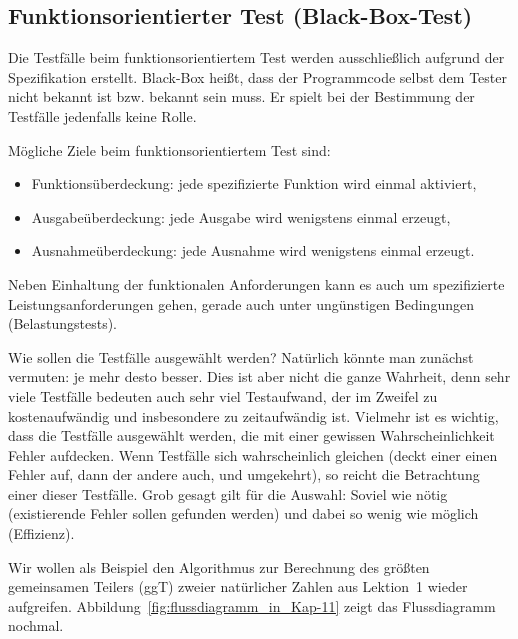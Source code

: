 \subsection{Funktionsorientierter Test (Black-Box-Test)}
\label{sec:Kap-11-1-4}

Die Testfälle beim funktionsorientiertem Test werden ausschließlich aufgrund der Spezifikation erstellt. 
Black-Box heißt, dass der Programmcode selbst dem Tester nicht bekannt ist bzw. bekannt sein muss. Er spielt bei der Bestimmung der Testfälle jedenfalls keine Rolle.

Mögliche Ziele beim funktionsorientiertem Test sind:
\begin{itemize}
	\item Funktionsüberdeckung: jede spezifizierte Funktion wird einmal aktiviert,
	\item Ausgabeüberdeckung: jede Ausgabe wird wenigstens einmal erzeugt, 
	\item Ausnahmeüberdeckung: jede Ausnahme wird wenigstens einmal erzeugt.
\end{itemize}

Neben Einhaltung der funktionalen Anforderungen kann es auch um spezifizierte Leistungsanforderungen gehen, gerade auch unter ungünstigen Bedingungen
\linebreak %
(Belastungs\-tests).

Wie sollen die Testfälle ausgewählt werden? Natürlich könnte man zunächst vermuten: je mehr desto besser. Dies ist aber nicht die ganze Wahrheit, denn sehr viele Testfälle bedeuten auch sehr viel Testaufwand, der im Zweifel zu kostenaufwändig und insbesondere zu zeitaufwändig ist. Vielmehr ist es wichtig, dass die Testfälle ausgewählt werden, die mit einer gewissen Wahrscheinlichkeit Fehler aufdecken. Wenn Testfälle sich wahrscheinlich gleichen (deckt einer einen Fehler auf, dann der andere auch, und umgekehrt), so reicht die Betrachtung einer dieser Testfälle. Grob gesagt gilt für die Auswahl: Soviel wie nötig (existierende Fehler sollen gefunden werden) und dabei so wenig wie möglich (Effizienz).

Wir wollen als Beispiel den Algorithmus zur Berechnung des größten gemeinsamen Teilers (ggT) zweier natürlicher Zahlen aus Lektion~1 %
wieder aufgreifen. Abbildung~\ref{fig:flussdiagramm_in_Kap-11} zeigt das Flussdiagramm nochmal.

